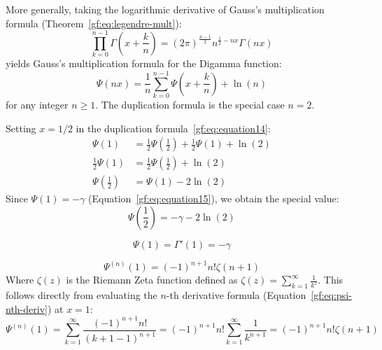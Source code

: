 \documentclass[a4paper]{article}
\begin{document}
    \begin{remark}
        More generally, taking the logarithmic derivative of Gauss's multiplication formula (Theorem~\ref{gf:eq:legendre-mult}):
        \begin{equation*}
            \prod_{k=0}^{n-1} \Gamma\left(x + \frac{k}{n}\right) = (2\pi)^{\frac{n-1}{2}} n^{\frac{1}{2} - nx} \Gamma(nx)
        \end{equation*}
        yields Gauss's multiplication formula for the Digamma function:
        \begin{equation}
            \label{gf:eq:digamma-multiplication}
            \boxed{
                \Psi(nx) = \frac{1}{n} \sum_{k=0}^{n-1} \Psi\left(x + \frac{k}{n}\right) + \ln(n)
            }
        \end{equation}
        for any integer $n \ge 1$. The duplication formula is the special case $n = 2$.
    \end{remark}

    \begin{example}
        Setting $x = 1/2$ in the duplication formula~\eqref{gf:eq:equation14}:
        \begin{align*}
            \Psi(1) & = \frac{1}{2} \Psi\left(\frac{1}{2}\right) + \frac{1}{2} \Psi(1) + \ln(2) \\
            \frac{1}{2} \Psi(1) & = \frac{1}{2} \Psi\left(\frac{1}{2}\right) + \ln(2) \\
            \Psi\left(\frac{1}{2}\right) & = \Psi(1) - 2\ln(2)
        \end{align*}
        Since $\Psi(1) = -\gamma$ (Equation~\ref{gf:eq:equation15}), we obtain the special value:
        \begin{equation}
            \label{gf:eq:psi-half}
            \boxed{
                \Psi\left(\frac{1}{2}\right) = -\gamma - 2\ln(2)
            }
        \end{equation}
    \end{example}

    \begin{equation}
        \Psi(1) = \Gamma'(1) = - \gamma \label{gf:eq:equation15}
    \end{equation}

    \begin{equation}
        \Psi^{(n)}(1) = (-1)^{n+1} n! \zeta(n+1) \label{gf:eq:equation16}
    \end{equation}
    Where $\zeta(z)$ is the Riemann Zeta function defined as $\zeta(z) = \sum_{k=1}^{\infty} \frac{1}{k^z}$.
    This follows directly from evaluating the $n$-th derivative formula (Equation~\ref{gf:eq:psi-nth-deriv}) at $x = 1$:
    \begin{equation*}
        \Psi^{(n)}(1) = \sum_{k=1}^{\infty} \frac{(-1)^{n+1} n!}{(k + 1 - 1)^{n+1}} = (-1)^{n+1} n! \sum_{k=1}^{\infty} \frac{1}{k^{n+1}} = (-1)^{n+1} n! \zeta(n+1)
    \end{equation*}
\end{document}
